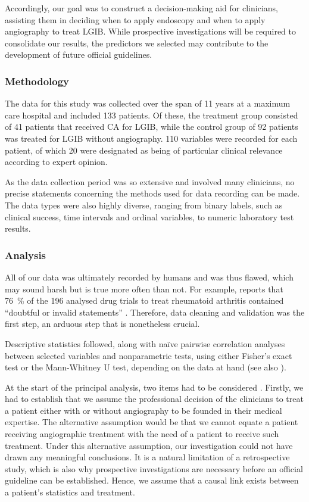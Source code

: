 Accordingly, our goal was to construct a decision-making aid for clinicians,
assisting them in deciding when to apply endoscopy and when to apply
angiography to treat LGIB. While prospective investigations will be required
to consolidate our results, the predictors we selected may contribute to the
development of future official guidelines.

\subsubsection{Methodology}\label{subsubsec:angiomethod}
The data for this study was collected over the span of \num{11} years at a
maximum care hospital and included \num{133} patients. Of these, the treatment
group consisted of \num{41} patients that received CA for LGIB, while the
control group of \num{92} patients was treated for LGIB without angiography.
\num{110} variables were recorded for each patient, of which \num{20} were
designated as being of particular clinical relevance according to expert
opinion.

As the data collection period was so extensive and involved many clinicians,
no precise statements concerning the methods used for data recording can be
made. The data types were also highly diverse, ranging from binary labels,
such as clinical success, time intervals and ordinal variables, to numeric
laboratory test results.

\subsubsection{Analysis}\label{subsubsec:angioanalysis}
All of our data was ultimately recorded by humans and was thus flawed, which
may sound harsh but is true more often than not. For example,
\citet{Gotzsche1989} reports that \SI{76}{\percent} of the \num{196} analysed
drug trials to treat rheumatoid arthritis contained \enquote{doubtful or
invalid statements} \citep{Brown2018}. Therefore, data cleaning and validation
was the first step, an arduous step that is nonetheless crucial.

Descriptive statistics followed, along with na\"{i}ve pairwise correlation
analyses between selected variables and nonparametric tests, using either
Fisher's exact test or the Mann-Whitney U test, depending on the data at hand
\citep{Winters2010} (see also ).

At the start of the principal analysis, two items had to be considered .
Firstly, we had to establish that we assume the professional decision of the
clinicians to treat a patient either with or without angiography to be founded
in their medical expertise. The alternative assumption would be that we cannot
equate a patient receiving angiographic treatment with the need of a patient
to receive such treatment. Under this alternative assumption, our
investigation could not have drawn any meaningful conclusions. It is a natural
limitation of a retrospective study, which is also why prospective
investigations are necessary before an official guideline can be established.
Hence, we assume that a causal link exists between a patient's statistics and
treatment.

